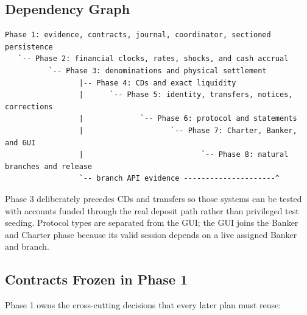 \documentclass[
  9pt,
  letterpaper,
]{extarticle}
\begin{document}
\subsection{Dependency Graph}\label{dependency-graph}

\begin{lstlisting}
Phase 1: evidence, contracts, journal, coordinator, sectioned persistence
   `-- Phase 2: financial clocks, rates, shocks, and cash accrual
          `-- Phase 3: denominations and physical settlement
                 |-- Phase 4: CDs and exact liquidity
                 |      `-- Phase 5: identity, transfers, notices, corrections
                 |             `-- Phase 6: protocol and statements
                 |                    `-- Phase 7: Charter, Banker, and GUI
                 |                           `-- Phase 8: natural branches and release
                 `-- branch API evidence ---------------------^
\end{lstlisting}

Phase 3 deliberately precedes CDs and transfers so those systems can be
tested with accounts funded through the real deposit path rather than
privileged test seeding. Protocol types are separated from the GUI; the
GUI joins the Banker and Charter phase because its valid session depends
on a live assigned Banker and branch.

\subsection{Contracts Frozen in Phase
1}\label{contracts-frozen-in-phase-1}

Phase 1 owns the cross-cutting decisions that every later plan must
reuse:
\end{document}
